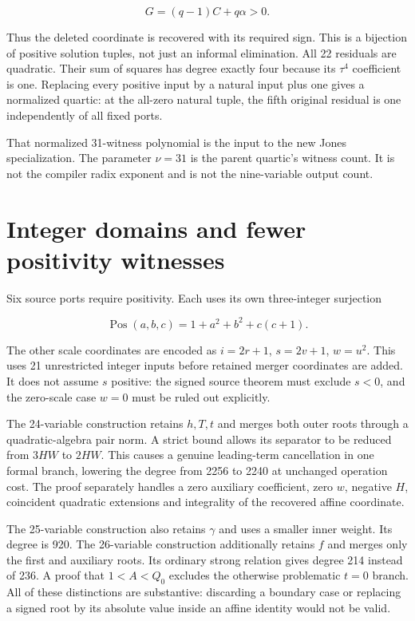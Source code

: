 \documentclass[
  10pt,
]{article}
\let\oldsection\section
\renewcommand{\section}{\clearpage\oldsection}
\begin{document}
\[G=(q-1)C+q\alpha>0.\]

Thus the deleted coordinate is recovered with its required sign. This is
a bijection of positive solution tuples, not just an informal
elimination. All 22 residuals are quadratic. Their sum of squares has
degree exactly four because its \(\tau^4\) coefficient is one. Replacing
every positive input by a natural input plus one gives a normalized
quartic: at the all-zero natural tuple, the fifth original residual is
one independently of all fixed ports.

That normalized 31-witness polynomial is the input to the new Jones
specialization. The parameter \(\nu=31\) is the parent quartic's witness
count. It is not the compiler radix exponent and is not the
nine-variable output count.

\section{Integer domains and fewer positivity
witnesses}\label{integer-domains-and-fewer-positivity-witnesses}

Six source ports require positivity. Each uses its own three-integer
surjection

\[\operatorname{Pos}(a, b, c)=1+a^2+b^2+c(c+1).\]

The other scale coordinates are encoded as \(i=2r+1\), \(s=2v+1\),
\(w=u^2\). This uses 21 unrestricted integer inputs before retained
merger coordinates are added. It does not assume \(s\) positive: the
signed source theorem must exclude \(s<0\), and the zero-scale case
\(w=0\) must be ruled out explicitly.

The 24-variable construction retains \(h, T, t\) and merges both outer
roots through a quadratic-algebra pair norm. A strict bound allows its
separator to be reduced from \(3HW\) to \(2HW\). This causes a genuine
leading-term cancellation in one formal branch, lowering the degree from
2256 to 2240 at unchanged operation cost. The proof separately handles a
zero auxiliary coefficient, zero \(w\), negative \(H\), coincident
quadratic extensions and integrality of the recovered affine coordinate.

The 25-variable construction also retains \(\gamma\) and uses a smaller
inner weight. Its degree is 920. The 26-variable construction
additionally retains \(f\) and merges only the first and auxiliary
roots. Its ordinary strong relation gives degree 214 instead of 236. A
proof that \(1<A<Q_0\) excludes the otherwise problematic \(t=0\)
branch. All of these distinctions are substantive: discarding a boundary
case or replacing a signed root by its absolute value inside an affine
identity would not be valid.
\end{document}
